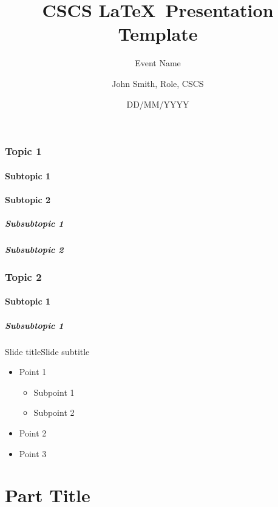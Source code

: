 \documentclass[aspectratio=169,12pt]{beamer}
\author{
  John Smith, Role, CSCS
}
\title{CSCS \LaTeX\ Presentation Template}
\subtitle{
  Event Name
}
\date{DD/MM/YYYY}
\begin{document}
\cscstitle


\section{Topic 1}
\subsection{Subtopic 1}
\subsection{Subtopic 2}
\subsubsection{Subsubtopic 1}
\subsubsection{Subsubtopic 2}

\section{Topic 2}
\subsection{Subtopic 1}
\subsubsection{Subsubtopic 1}


\begin{frame}{Slide title}{Slide subtitle}
  \begin{itemize}
  \item Point 1
    \begin{itemize}
    \item Subpoint 1
    \item Subpoint 2
    \end{itemize}
  \item Point 2
  \item Point 3
  \end{itemize}
\end{frame}

\part{Part Title}
\end{document}
